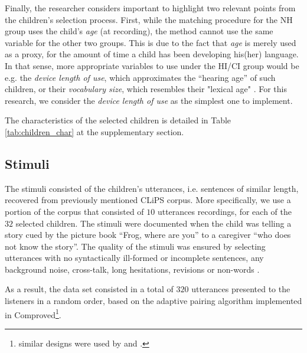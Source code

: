 Finally, the researcher considers important to highlight two relevant points from the children's selection process. First, while the matching procedure for the NH group uses the child's \textit{age} (at recording), the method cannot use the same variable for the other two groups. This is due to the fact that \textit{age} is merely used as a proxy, for the amount of time a child has been developing his(her) language. In that sense, more appropriate variables to use under the HI/CI group would be e.g. the \textit{device length of use}, which approximates the ``hearing age'' of such children, or their \textit{vocabulary size}, which resembles their "lexical age" \citep{Faes_et_al_2021}. For this research, we consider the \textit{device length of use} as the simplest one to implement. 

The characteristics of the selected children is detailed in Table \ref{tab:children_char} at the supplementary section. 
%
\begin{comment}
\textbf{for the experimenter:} Based on \citet{Faes_et_al_2021} we depict the procedure for the experimenter:
%
\begin{enumerate}
	\item 1. matching procedure 
	\item selection of suitable stimuli
	\item determine the number of stimuli per judge 
\end{enumerate}	
\end{comment}
%
%
\subsection{Stimuli} \label{ss:stimuli}
%
The stimuli consisted of the children's utterances, i.e. sentences of similar length, recovered from previously mentioned CLiPS corpus. More specifically, we use a portion of the corpus that consisted of $10$ utterances recordings, for each of the $32$ selected children. The stimuli were documented when the child was telling a story cued by the picture book ``Frog, where are you'' \citep{Mayer_1969} to a caregiver ``who does not know the story''. The quality of the stimuli was ensured by selecting utterances with no syntactically ill-formed or incomplete sentences, any background noise, cross-talk, long hesitations, revisions or non-words \citep{Boonen_et_al_2021}. 

As a result, the data set consisted in a total of $320$ utterances presented to the listeners in a random order, based on the adaptive pairing algorithm \citep{Pollitt_2012b} implemented in Comproved\footnote{similar designs were used by \citet{Boonen_et_al_2020} and \citet{Faes_et_al_2021}.}.

